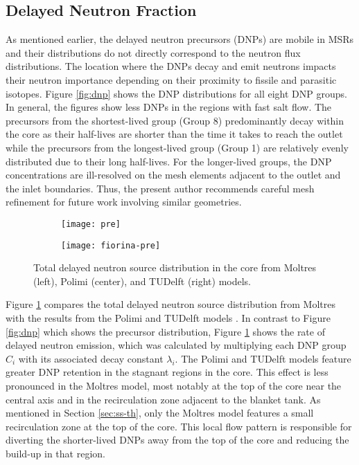 \subsection{Delayed Neutron Fraction}

As mentioned earlier, the delayed neutron precursors (DNPs) are mobile in
\glspl{MSR} and their distributions do not directly correspond to the neutron
flux distributions. The location where the \glspl{DNP} decay and emit neutrons
impacts their neutron
importance depending on their proximity to fissile and parasitic isotopes.
Figure \ref{fig:dnp} shows the \gls{DNP} distributions for all eight \gls{DNP}
groups. In general, the figures show less \glspl{DNP} in the regions with fast
salt flow. The
precursors from the shortest-lived group (Group 8) predominantly decay within
the core as their half-lives are shorter than the time it takes to reach the
outlet while the precursors from the longest-lived group (Group 1) are
relatively evenly distributed due to their long half-lives. For the
longer-lived groups, the \gls{DNP} concentrations are ill-resolved on the
mesh elements adjacent to the outlet and the inlet boundaries.
Thus, the present author recommends careful mesh refinement for future work
involving similar geometries.

\begin{figure}[b!]
    \centering
    \begin{subfigure}[t]{.30\textwidth}
        \centering
        \vspace{.9cm}
        \texttt{[image: pre]}
    \end{subfigure}
    \begin{subfigure}[t]{.69\textwidth}
        \centering
        \vspace{0pt}
        \texttt{[image: fiorina-pre]}
    \end{subfigure}
    \caption{Total delayed neutron source distribution in the core from
    Moltres (left), Polimi (center), and TUDelft (right) models.}
    \label{fig:pre}
\end{figure}

Figure \ref{fig:pre} compares the total delayed neutron source
distribution from Moltres with the results from the Polimi and TUDelft models
\cite{fiorina_modelling_2014}. In contrast to Figure \ref{fig:dnp} which shows
the precursor distribution, Figure \ref{fig:pre} shows the rate of delayed
neutron emission, which was calculated by multiplying each \gls{DNP} group
$C_i$ with its associated decay constant $\lambda_i$.
The Polimi and TUDelft models
feature greater \gls{DNP} retention in the stagnant regions in the core. This
effect is less pronounced in the Moltres model, most notably at the top of the
core near the central axis and in the recirculation zone adjacent to the
blanket tank. As mentioned in Section \ref{sec:ss-th}, only the Moltres model
features a small recirculation zone at the top of the core. This local flow
pattern is responsible for diverting the shorter-lived \glspl{DNP} away from
the top of the core and reducing the build-up in that region.

